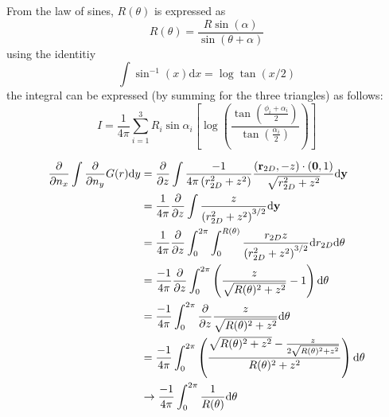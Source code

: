 \documentclass[a4paper,11pt]{article}
\newcommand{\td}{\mathrm{d}}
\begin{document}

From the law of sines, $R(\theta)$ is expressed as
%
\begin{equation}
R(\theta) = \frac{R \sin(\alpha)}{\sin(\theta+\alpha)}
\end{equation}
%
using the identitiy
%
\begin{equation}
\int \sin^{-1}(x) \td x = \log \tan (x/2)
\end{equation}
%
the integral can be expressed (by summing for the three triangles) as follows:
%
\begin{equation}
I = \frac{1}{4\pi} \sum_{i = 1}^3
R_i \sin\alpha_i \left[ \log \left( \frac{\tan\left(\frac{\phi_i+\alpha_i}{2}\right)}{\tan\left(\frac{\alpha_i}{2}\right)}\right)\right]
\end{equation}


\begin{align}
\frac{\partial}{\partial n_x}
\int
\frac{\partial}{\partial n_y}
G(r)
\td y
&=
\frac{\partial}{\partial z}
\int
\frac{-1}{4\pi \left(r^2_{2D} + z^2\right)}
\frac{({\bf r}_{2D},-z)\cdot({\bf 0},1)}{\sqrt{r^2_{2D} + z^2}}
\td {\bf y}
\nonumber \\
&=
\frac{1}{4\pi}
\frac{\partial}{\partial z}
\int
\frac{z}{\left(r^2_{2D} + z^2\right)^{3/2}}
\td {\bf y}
\nonumber \\
&=
\frac{1}{4\pi}
\frac{\partial}{\partial z}
\int_{0}^{2\pi}
\int_{0}^{R(\theta)}
\frac{r_{2D} z}{\left(r^2_{2D} + z^2\right)^{3/2}}
\td r_{2D}
\td \theta
\nonumber \\
&=
\frac{-1}{4\pi}
\frac{\partial}{\partial z}
\int_{0}^{2\pi}
\left(
\frac{z}{\sqrt{R(\theta)^2 + z^2}}
-
1
\right)
\td \theta
\nonumber \\
&=
\frac{-1}{4\pi}
\int_{0}^{2\pi}
\frac{\partial}{\partial z}
\frac{z}{\sqrt{R(\theta)^2 + z^2}}
\td \theta
\nonumber \\
&=
\frac{-1}{4\pi}
\int_{0}^{2\pi}
\left(
\frac{\sqrt{R(\theta)^2 + z^2} - \frac{z}{2\sqrt{R(\theta)^2 + z^2}}}{R(\theta)^2 + z^2}
\right)
\td \theta
\nonumber \\
&\to
\frac{-1}{4\pi}
\int_{0}^{2\pi}
\frac{1}{R(\theta)}
\td \theta
\end{align}
\end{document}

